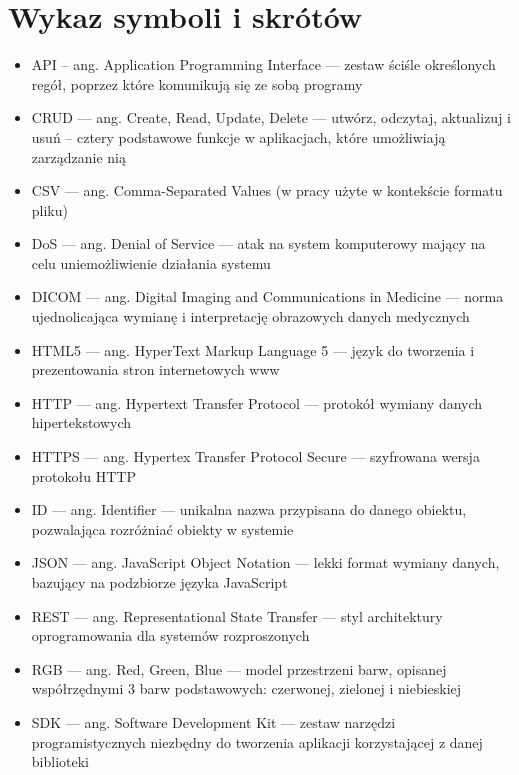 \documentclass[a4paper,11pt,twoside,openright]{report}
\theoremstyle{definition}
\begin{document}
\chapter*{Wykaz symboli i skrótów}


\begin{itemize}[noitemsep]
\item API -- ang. Application Programming Interface --- zestaw ściśle określonych regół, poprzez które komunikują się ze sobą programy\\
\item CRUD --- ang. Create, Read, Update, Delete --- utwórz, odczytaj, aktualizuj i usuń -- cztery podstawowe funkcje w aplikacjach, które umożliwiają zarządzanie nią\\
\item CSV --- ang. Comma-Separated Values (w pracy użyte w kontekście formatu pliku) \\
\item DoS --- ang. Denial of Service --- atak na system komputerowy mający na celu uniemożliwienie działania systemu\\
\item DICOM --- ang. Digital Imaging and Communications in Medicine --- norma ujednolicająca wymianę i interpretację obrazowych danych medycznych\\
\item HTML5 --- ang. HyperText Markup Language 5 --- język do tworzenia i prezentowania stron internetowych www\\
\item HTTP --- ang. Hypertext Transfer Protocol --- protokół wymiany danych hipertekstowych\\
\item HTTPS --- ang. Hypertex Transfer Protocol Secure --- szyfrowana wersja protokołu HTTP\\
\item ID --- ang. Identifier --- unikalna nazwa przypisana do danego obiektu, pozwalająca rozróżniać obiekty w systemie\\
\item JSON --- ang. JavaScript Object Notation --- lekki format wymiany danych, bazujący na podzbiorze języka JavaScript\\
\item REST --- ang. Representational State Transfer --- styl architektury oprogramowania dla systemów rozproszonych\\
\item RGB --- ang. Red, Green, Blue --- model przestrzeni barw, opisanej współrzędnymi 3 barw podstawowych: czerwonej, zielonej i niebieskiej\\
\item SDK --- ang. Software Development Kit --- zestaw narzędzi programistycznych niezbędny do tworzenia aplikacji korzystającej z danej biblioteki\\
\end{itemize}
\end{document}
